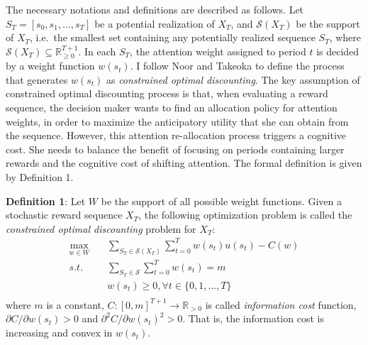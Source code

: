 \documentclass[
  12pt,
]{article}
\begin{document}
The necessary notations and definitions are described as follows. Let
\(S_T=[s_0,s_1,...,s_T]\) be a potential realization of \(X_T\), and
\(\mathcal{S}(X_T)\) be the support of \(X_T\), i.e.~the smallest set
containing any potentially realized sequence \(S_T\), where
\(\mathcal{S}(X_T)\subseteq \mathbb{R}_{\geq 0}^{T+1}\). In each
\(S_T\), the attention weight assigned to period \(t\) is decided by a
weight function \(w(s_t)\). I follow Noor and Takeoka
\citetext{\citeyear{noor_optimal_2022}; \citeyear{noor_constrained_2023}}
to define the process that generates \(w(s_t)\) as \emph{constrained
optimal discounting}. The key assumption of constrained optimal
discounting process is that, when evaluating a reward sequence, the
decision maker wants to find an allocation policy for attention weights,
in order to maximize the anticipatory utility that she can obtain from
the sequence. However, this attention re-allocation process triggers a
cognitive cost. She needs to balance the benefit of focusing on periods
containing larger rewards and the cognitive cost of shifting attention.
The formal definition is given by Definition 1.

\textbf{Definition 1}: Let \(W\) be the support of all possible weight
functions. Given a stochastic reward sequence \(X_T\), the following
optimization problem is called the \emph{constrained optimal
discounting} problem for \(X_T\):\[ 
\begin{aligned}
\max_{w\in W}  \quad & \sum_{S_T\in \mathcal{S}(X_T)}\sum_{t=0}^T w(s_t)u(s_t) - C(w) \\
s.t. \quad &  \sum_{S_T\in \mathcal{S}}\sum_{t=0}^T w(s_t)=m \\
& w(s_t)\geq 0, \forall t\in\{0,1,…,T\} \\
\end{aligned}
\]where \(m\) is a constant,
\(C:[0,m]^{T+1}\rightarrow \mathbb{R}_{>0}\) is called \emph{information
cost} function, \(\partial C/\partial w(s_t)>0\) and
\(\partial^2 C/\partial w(s_t)^2>0\). That is, the information cost is
increasing and convex in \(w(s_t)\).
\end{document}
